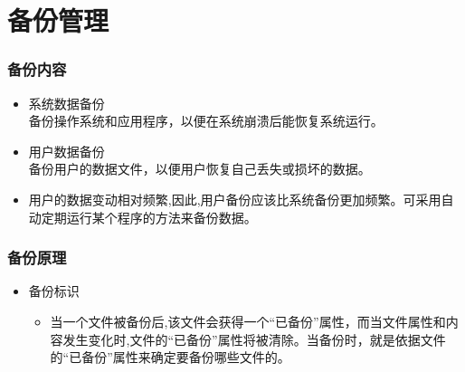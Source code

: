 \documentclass[xcolor=svgnames,presentation]{beamer}
\begin{document}
\section{备份管理}
\label{sec-7}
\begin{frame}
\frametitle{备份内容}
\label{sec-7-1}
\begin{itemize}

\item 系统数据备份\\
\label{sec-7-1-1}%
备份操作系统和应用程序，以便在系统崩溃后能恢复系统运行。

\item 用户数据备份\\
\label{sec-7-1-2}%
备份用户的数据文件，以便用户恢复自己丢失或损坏的数据。

\item 用户的数据变动相对频繁,因此,用户备份应该比系统备份更加频繁。可采用自动定期运行某个程序的方法来备份数据。
\label{sec-7-1-3}%
\end{itemize} %
\end{frame}
\begin{frame}
\frametitle{备份原理}
\label{sec-7-2}
\begin{itemize}

\item 备份标识
\label{sec-7-2-1}%
\begin{itemize}

\item 当一个文件被备份后,该文件会获得一个“已备份”属性，而当文件属性和内容发生变化时,文件的“已备份”属性将被清除。当备份时，就是依据文件的“已备份”属性来确定要备份哪些文件的。
\label{sec-7-2-1-1}%
\end{itemize} %
\end{itemize} %
\end{frame}
\end{document}
